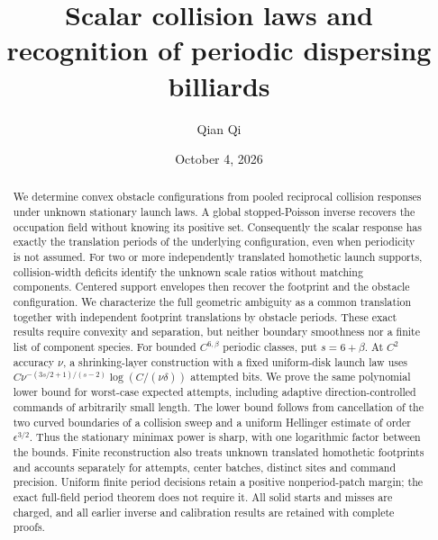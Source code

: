 \documentclass[11pt]{amsart}
\title[Scalar collision laws]{Scalar collision laws and recognition of periodic dispersing billiards}
\author{Qian Qi}
\date{October 4, 2026}
\theoremstyle{definition}\newtheorem{definition}[theorem]{Definition}
\theoremstyle{remark}\newtheorem{remark}[theorem]{Remark}
\numberwithin{equation}{section}
\begin{document}
\raggedbottom
\begin{abstract}
We determine convex obstacle configurations from pooled reciprocal
collision responses under unknown stationary launch laws. A global
stopped-Poisson inverse recovers the occupation field without knowing
its positive set. Consequently the scalar response has exactly the
translation periods of the underlying configuration, even when
periodicity is not assumed. For two or more independently translated
homothetic launch supports, collision-width deficits identify the
unknown scale ratios without matching components. Centered support
envelopes then recover the footprint and the obstacle configuration.
We characterize the full geometric ambiguity as a common translation
together with independent footprint translations by obstacle periods.
These exact results require convexity and separation, but neither
boundary smoothness nor a finite list of component species.
For bounded $C^{6,\beta}$ periodic classes, put $s=6+\beta$.
At $C^2$ accuracy $\nu$, a shrinking-layer construction with a fixed
uniform-disk launch law uses
$C\nu^{-(3s/2+1)/(s-2)}\log(C/(\nu\delta))$ attempted bits.
We prove the same polynomial lower bound for worst-case expected
attempts, including adaptive direction-controlled commands of
arbitrarily small length. The lower bound follows from cancellation
of the two curved boundaries of a collision sweep and a uniform
Hellinger estimate of order $\epsilon^{3/2}$.
Thus the stationary minimax power is sharp, with one logarithmic
factor between the bounds. Finite reconstruction also treats unknown
translated homothetic footprints and accounts separately for attempts,
center batches, distinct sites and command precision. Uniform finite
period decisions retain a positive nonperiod-patch margin; the exact
full-field period theorem does not require it. All solid starts and
misses are charged, and all earlier inverse and calibration results
are retained with complete proofs.
\end{abstract}
\maketitle











\appendix












\end{document}
